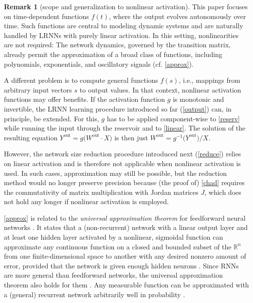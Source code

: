 \documentclass{sn-jnl}
\theoremstyle{definition}
\newtheorem{remk}{Remark}
\begin{document}
\begin{remk}[scope and generalization to nonlinear activation]
This paper focuses on time-dependent functions $f(t)$, where the output evolves
autonomously over time. Such functions are central to modeling dynamic systems
and are naturally handled by LRNNs with purely linear activation. In this
setting, nonlinearities are not required: The network dynamics, governed by the
transition matrix, already permit the approximation of a broad class of
functions, including polynomials, exponentials, and oscillatory signals (cf.
\cref{approx}). 

A different problem is to compute general functions $f(s)$, i.e., mappings from
arbitrary input vectors $s$ to output values. In that context, nonlinear
activation functions may offer benefits. If the activation function $g$ is
monotonic and invertible, the LRNN learning procedure introduced so far (\cref{output}) can, in
principle, be extended. For this, $g$ has to be applied component-wise to
\cref{reserv} while running the input through the reservoir and to
\cref{linear}. The solution of the resulting equation $Y^\mathrm{out} =
g\big(W^\mathrm{out} \cdot X\big)$ is then just $W^\mathrm{out} =
g^{-1}\big(Y^\mathrm{out}\big)/X$.

However, the network size reduction procedure introduced next (\cref{reduce})
relies on linear activation and is therefore not applicable when nonlinear
activation is used. In such cases, approximation may still be possible, but the
reduction method would no longer preserve precision because (the proof of)
\cref{chad} requires the commutativity of matrix multiplication with Jordan
matrices $J$, which does not hold any longer if nonlinear activation is
employed.
\end{remk}

\cref{approx} is related to the \emph{universal approximation theorem} for
feedforward neural networks \citep{Hor91}. It states that a (non-recurrent)
network with a linear output layer and at least one hidden layer activated by a
nonlinear, sigmoidal function can approximate any continuous function on a
closed and bounded subset of the $\mathbb{R}^n$ from one finite-dimensional
space to another with any desired nonzero amount of error, provided that the
network is given enough hidden neurons \citep[Section~6.4.1]{GBC16}. Since RNNs
are more general than feedforward networks, the universal approximation theorem
also holds for them \citep{MNM02}. Any measurable function can be
approximated with a (general) recurrent network arbitrarily well in probability
\citep{Ham00}.
\end{document}
